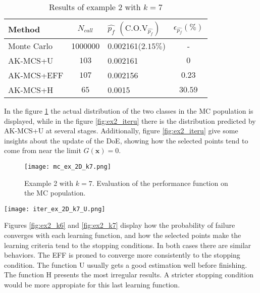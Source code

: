 \begin{table}[h]
    \footnotesize
    \begin{center}
    \begin{tabular}{lclc}
    \toprule
    Method & $N_{call}$  & $\widehat{p_f}$ $(\text{C.O.V}_{\widehat{p_f}})$ &$\epsilon_{\widehat{p_f}}(\%)$  \\
    \midrule
    Monte Carlo   & \num[round-precision=1,round-mode=figures]{1000000} & \num{0.002161}($2.15\%$) & - \\
    AK-MCS+U & $103$ & \num{0.002161} & $0$ \\
    AK-MCS+EFF & $107$ & \num{0.002156} & $0.23$ \\
    AK-MCS+H & $65$ & \num{0.0015} & $30.59$ \\
    \bottomrule
    \end{tabular}
    \end{center}
    \caption{Results of example 2 with $k=7$}
    \label{tab:res_ex2_2}
\end{table}

In the figure \ref{fig:ex2_mc} the actual distribution of the two classes in the
MC population is displayed, while in the figure \ref{fig:ex2_iteru} there is the
distribution predicted by AK-MCS+U at several stages. Additionally, figure \ref{fig:ex2_iteru}
give some insights about the update of the DoE, showing how the selected points tend to
come from near the limit $G(\pmb{x}) = 0$. \\

\begin{figure}[h]
    \texttt{[image: mc\_ex\_2D\_k7.png]}
    \caption{Example 2 with $k=7$. Evaluation of the performance function on the MC population.}
    \label{fig:ex2_mc}
\end{figure}

\begin{figure*}[h]
    \texttt{[image: iter\_ex\_2D\_k7\_U.png]}
    \caption{Example 2 with $k=7$. Prediction made by AK-MCS+U at several stages.}
    \label{fig:ex2_iteru}
\end{figure*}

Figures  \ref{fig:ex2_k6} and \ref{fig:ex2_k7} display how the probability of failure
converges with each learning function, and how the selected points make the learning criteria
tend to the stopping conditions. In both cases there are similar behaviors. The 
EFF is proned to converge more consistently to the stopping condition. The function 
U usually gets a good estimation well before finishing. The function H
presents the most irregular results. A stricter stopping condition would be more appropiate
for this last learning function.

